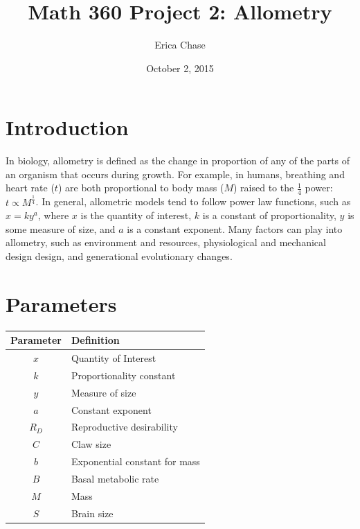 \documentclass[10pt,letterpaper]{article}
\begin{document}
	\title{Math 360 Project 2: Allometry}
	\author{Erica Chase}
	\date {October 2, 2015}
	\maketitle
	\section{Introduction}
		In biology, allometry is defined as the change in proportion of any of the parts of an organism that occurs during growth. For example, in humans, breathing and heart rate ($t$) are both proportional to body mass ($M$) raised to the $\frac 1 4$ power: $t \propto M^{\frac 1 4}$. In general, allometric models tend to follow power law functions, such as $x = ky^{a}$, where $x$ is the quantity of interest, $k$ is a constant of proportionality, $y$ is some measure of size, and $a$ is a constant exponent. Many factors can play into allometry, such as environment and resources, physiological and mechanical design design, and generational evolutionary changes. 
	\section{Parameters}
		\begin{center}
			\begin{tabular}{c l}
				Parameter & Definition \\
				\hline \hline
				$x$ & Quantity of Interest \\
				$k$ & Proportionality constant \\
				$y$ & Measure of size \\
				$a$ & Constant exponent \\
				\hline
				$R_{D}$ & Reproductive desirability \\
				$C$ & Claw size \\
				$b$ & Exponential constant for mass \\
				\hline
				$B$ & Basal metabolic rate \\
				$M$ & Mass \\
				\hline
				$S$ & Brain size
			\end{tabular}
		\end{center}
\end{document}
